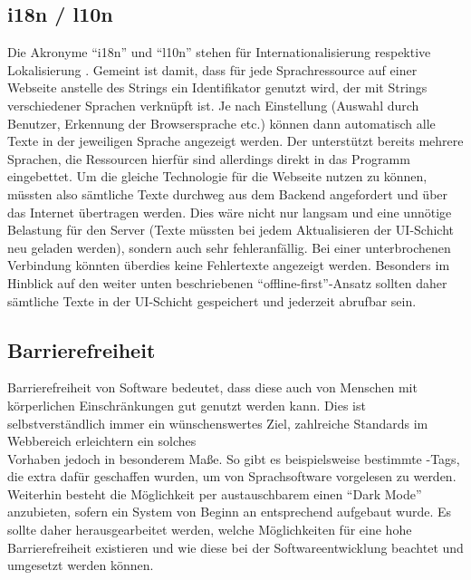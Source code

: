 \subsection{i18n / l10n}
Die Akronyme \enquote{i18n} und \enquote{l10n} stehen für Internationalisierung respektive Lokalisierung \parencite[vgl.][]{i18n_i10n_ishida_w3c_miller_boeing_2018}. Gemeint ist damit, dass für jede Sprachressource auf einer Webseite anstelle des Strings ein Identifikator genutzt wird, der mit Strings verschiedener Sprachen verknüpft ist. Je nach Einstellung (Auswahl durch Benutzer, Erkennung der Browsersprache etc.) können dann automatisch alle Texte in der jeweiligen Sprache angezeigt werden. Der  unterstützt bereits mehrere Sprachen, die Ressourcen hierfür sind allerdings direkt in das Programm eingebettet. Um die gleiche Technologie für die Webseite nutzen zu können, müssten also sämtliche Texte durchweg aus dem Backend angefordert und über das Internet übertragen werden. Dies wäre nicht nur langsam und eine unnötige Belastung für den Server (Texte müssten bei jedem Aktualisieren der UI-Schicht neu geladen werden), sondern auch sehr fehleranfällig. Bei einer unterbrochenen Verbindung könnten überdies keine Fehlertexte angezeigt werden. Besonders im Hinblick auf den weiter unten beschriebenen \enquote{offline-first}-Ansatz sollten daher sämtliche Texte in der UI-Schicht gespeichert und jederzeit abrufbar sein.

\subsection{Barrierefreiheit}
Barrierefreiheit von Software bedeutet, dass diese auch von Menschen mit körperlichen Einschränkungen gut genutzt werden kann. Dies ist selbstverständlich immer ein wünschenswertes Ziel, zahlreiche Standards im Webbereich erleichtern ein solches\\ Vorhaben jedoch in besonderem Maße. So gibt es beispielsweise bestimmte -Tags, die extra dafür geschaffen wurden, um von Sprachsoftware vorgelesen zu werden. Weiterhin besteht die Möglichkeit per austauschbarem  einen \enquote{Dark Mode} anzubieten, sofern ein System von Beginn an entsprechend aufgebaut wurde.
Es sollte daher herausgearbeitet werden, welche Möglichkeiten für eine hohe Barrierefreiheit existieren und wie diese bei der Softwareentwicklung beachtet und umgesetzt werden können.

